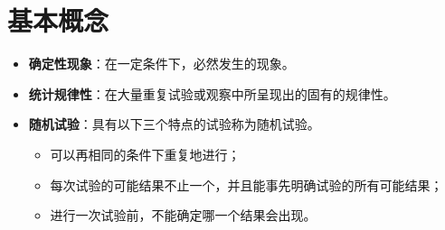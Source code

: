 \documentclass[11pt]{book}
\newcounter{#2}
\newcounter{#2}[#1]
\numberwithin{#2}{#1}
\begin{document}
	\section{基本概念}
	\begin{itemize}
		\item \textbf{确定性现象}：在一定条件下，必然发生的现象。
		\item \textbf{统计规律性}：在大量重复试验或观察中所呈现出的固有的规律性。
		\item \textbf{随机试验}：具有以下三个特点的试验称为随机试验。
		\begin{itemize}
			\item 可以再相同的条件下重复地进行；
			\item 每次试验的可能结果不止一个，并且能事先明确试验的所有可能结果；
			\item 进行一次试验前，不能确定哪一个结果会出现。
		\end{itemize} 
	

\end{itemize}
\end{document}
